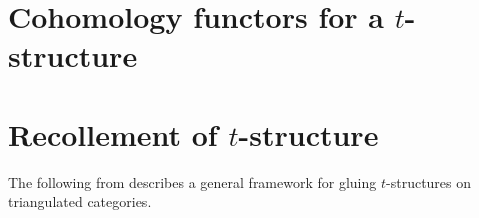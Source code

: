 











\section{Cohomology functors for a \texorpdfstring{$t$}{t}-structure}












\section{Recollement of $t$-structure}

The following from \cite[Section 1.4]{beilinson_berstein_deligne_atlesI} describes a general framework for gluing $t$-structures on triangulated categories.







